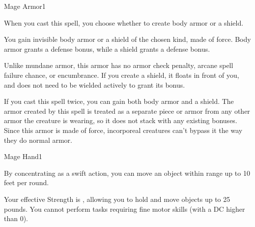 \begin{spellsection}{Mage Armor}{1}
\begin{spellheader}
\end{spellheader}
\begin{spellcontent}
    \begin{spelltargetinginfo}
        \spellspecial When you cast this spell, you choose whether to create body armor or a shield.
    \end{spelltargetinginfo}
    \begin{spelleffects}
        \spelleffect You gain invisible body armor or a shield of the chosen kind, made of force. Body armor grants a  defense bonus, while a shield grants a  defense bonus.
        \par Unlike mundane armor, this armor has no armor check penalty, arcane spell failure chance, or encumbrance. If you create a shield, it floats in front of you, and does not need to be wielded actively to grant its bonus.
        \spelldur \durlong
    \end{spelleffects}
\end{spellcontent}
\begin{spellfooter}
    \spellnotes If you cast this spell twice, you can gain both body armor and a shield. The armor created by this spell is treated as a separate piece or armor from any other armor the creature is wearing, so it does not stack with any existing bonuses. Since this armor is made of force, incorporeal creatures can't bypass it the way they do normal armor.
\end{spellfooter}
\end{spellsection}

\begin{spellsection}{Mage Hand}{1}
\begin{spellheader}
\end{spellheader}
\begin{spellcontent}
    \begin{spelltargetinginfo}
        \spellrng{\rngclose}
    \end{spelltargetinginfo}
    \begin{spelleffects}
        \spelleffect By concentrating as a swift action, you can move an object within range up to 10 feet per round.
        
        Your effective Strength is , allowing you to hold and move objects up to 25 pounds. You cannot perform tasks requiring fine motor skills (with a DC higher than 0).
        \spelldur \durshort
    \end{spelleffects}
\end{spellcontent}
\begin{spellfooter}
\end{spellfooter}
\end{spellsection}

